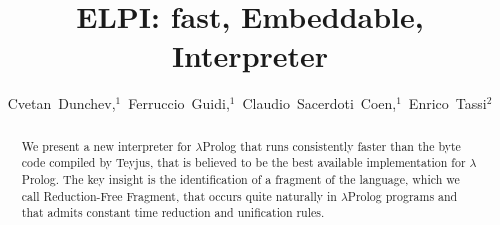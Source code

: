 \documentclass{llncs}
\begin{document}
\title{ELPI: fast, Embeddable, \lp{} Interpreter}





\author{Cvetan~Dunchev,$^1$~Ferruccio~Guidi,$^1$~Claudio~Sacerdoti~Coen,$^1$~Enrico~Tassi$^2$}






\newcommand{\frag}{Reduction-Free Fragment}
\newcommand{\lp}{$\lambda$Prolog}
\newcommand{\Ll}{\ensuremath{\mathcal{L}_\lambda}}
\newcommand{\rff}{\ensuremath{\mathcal{L}_\lambda^\beta}}
\newcommand{\elpi}{ELPI}
\newcommand{\tedius}{Teyjus}
\newcommand{\CSC}[1]{\textcolor{red}{#1}}
\newcommand{\FG}[1]{\textcolor{magenta}{#1}}

\maketitle

\begin{abstract}
We present a new interpreter for \lp{} that runs consistently faster than
the byte code compiled by \tedius{}, that is believed to be the best
available implementation for \lp. 
The key insight is the identification of a fragment of
the language, which we call \frag{}, that occurs quite naturally in \lp{}
programs and that admits constant time reduction and unification rules.
\end{abstract}
\end{document}
